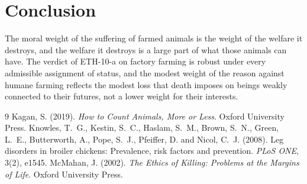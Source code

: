 \documentclass{situationist-preprint}
\begin{document}
\section{Conclusion}

The moral weight of the suffering of farmed animals is the weight of the welfare it destroys, and the welfare it destroys is a large part of what those animals can have. The verdict of ETH-10-a on factory farming is robust under every admissible assignment of status, and the modest weight of the reason against humane farming reflects the modest loss that death imposes on beings weakly connected to their futures, not a lower weight for their interests.

\begin{thebibliography}{9}\small
{} Kagan, S. (2019). \emph{How to Count Animals, More or Less}. Oxford University Press.
 Knowles, T.~G., Kestin, S.~C., Haslam, S.~M., Brown, S.~N., Green, L.~E., Butterworth, A., Pope, S.~J., Pfeiffer, D. and Nicol, C.~J. (2008). Leg disorders in broiler chickens: Prevalence, risk factors and prevention. \emph{PLoS ONE}, 3(2), e1545.
 McMahan, J. (2002). \emph{The Ethics of Killing: Problems at the Margins of Life}. Oxford University Press.
\end{thebibliography}
\end{document}

